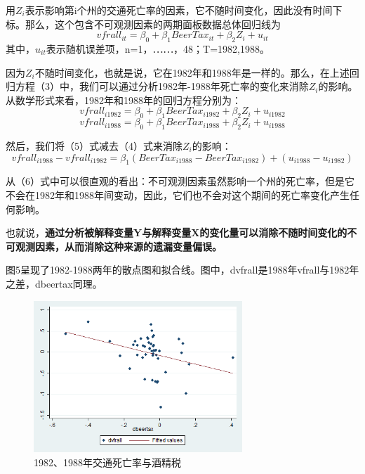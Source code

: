 \documentclass[cn,12pt,math=newtx,citestyle=gb7714-2015,bibstyle=gb7714-2015]{elegantbook}
\begin{document}
用$Z_i$表示影响第i个州的交通死亡率的因素，它不随时间变化，因此没有时间下标。那么，这个包含不可观测因素的两期面板数据总体回归线为
\begin{equation}
	vfrall_{it}=\beta_{0}+\beta_{1}BeerTax_{it}+\beta_{2}Z_i+u_{it}
\end{equation}
其中，$u_{it}$表示随机误差项，n=1，⋯⋯，48；T=1982,1988。

因为$Z_i$不随时间变化，也就是说，它在1982年和1988年是一样的。那么，在上述回归方程（3）中，我们可以通过分析1982年-1988年死亡率的变化来消除$Z_i$的影响。从数学形式来看，1982年和1988年的回归方程分别为：
\begin{equation}
	vfrall_{i1982}=\beta_{0}+\beta_{1}BeerTax_{i1982}+\beta_{2}Z_i+u_{i1982}
\end{equation}
\begin{equation}
	vfrall_{i1988}=\beta_{0}+\beta_{1}BeerTax_{i1988}+\beta_{2}Z_i+u_{i1988}
\end{equation}

然后，我们将（5）式减去（4）式来消除$Z_i$的影响：
\begin{equation}
	vfrall_{i1988}-vfrall_{i1982}=\beta_{1}(BeerTax_{i1988}-BeerTax_{i1982})+(u_{i1988}-u_{i1982})
\end{equation}

从（6）式中可以很直观的看出：不可观测因素虽然影响一个州的死亡率，但是它不会在1982年和1988年间变动，因此，它们也不会对这个期间的死亡率变化产生任何影响。

也就说，\textbf{通过分析被解释变量Y与解释变量X的变化量可以消除不随时间变化的不可观测因素，从而消除这种来源的遗漏变量偏误。}

图5呈现了1982-1988两年的散点图和拟合线。图中，dvfrall是1988年vfrall与1982年之差，dbeertax同理。
\begin{figure}[htbp]
	\centering
	\includegraphics[width=0.7\textwidth]{8288.png}
	\caption{1982、1988年交通死亡率与酒精税}\label{fig:digit}
\end{figure}
\end{document}
